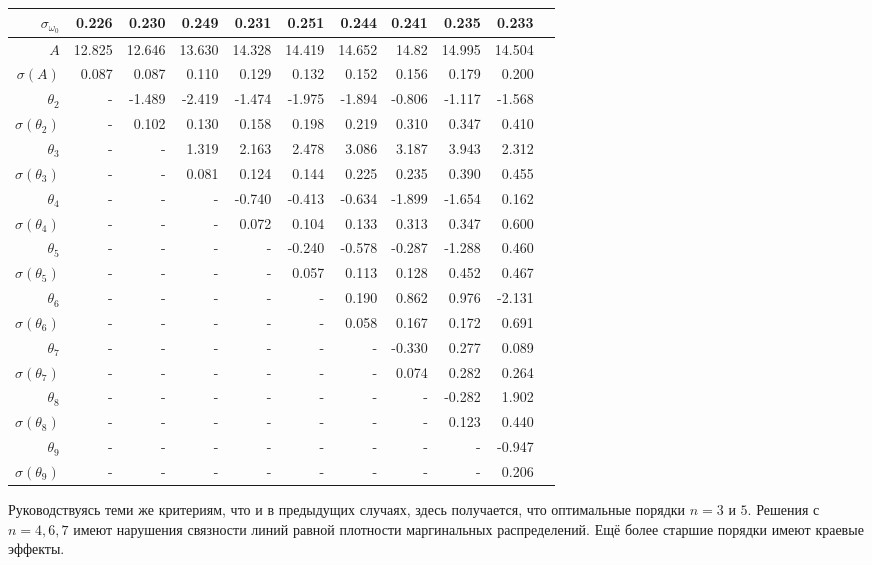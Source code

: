 \documentclass{matmex-diploma-custom}
\begin{document}
\begin{table}[h!!]
\begin{tabular}{r|rr|r|r|r|rrrrr}
 $\sigma_{\omega_0} $& 0.226       &     0.230 &   0.249 &   0.231 &   0.251 &   0.244 &    0.241 &   0.235 &   0.233 \\\hline
 $A $&12.825      &   12.646 &   13.630 &  14.328 &  14.419 &  14.652 &    14.82 &  14.995 &  14.504 \\
 $\sigma(A) $ & 0.087       &    0.087 &    0.110 &   0.129 &   0.132 &   0.152 &    0.156 &   0.179 &     0.200 \\
 $\theta_2$&-        &  -1.489 &  -2.419 &  -1.474 &  -1.975 &  -1.894 &   -0.806 &  -1.117 &  -1.568 \\
 $\sigma(\theta_2)$&-      &     0.102 &    0.130 &   0.158 &   0.198 &   0.219 &     0.310 &   0.347 &    0.410 \\
 $\theta_3$&-      &    - &   1.319 &   2.163 &   2.478 &   3.086 &    3.187 &   3.943 &   2.312 \\
 $\sigma(\theta_3)$&-      &    - &   0.081 &   0.124 &   0.144 &   0.225 &    0.235 &   0.390 &   0.455 \\
 $\theta_4$&-      &    - &    - &  -0.740 &  -0.413 &  -0.634 &   -1.899 &  -1.654 &   0.162 \\
 $\sigma(\theta_4)$&-      &    - &    - &     0.072 &   0.104 &   0.133 &    0.313 &   0.347 &   0.600 \\
 $\theta_5$&-      &    - &    - &    - &  -0.240 &  -0.578 &   -0.287 &  -1.288 &   0.460 \\
 $\sigma(\theta_5)$&-      &    - &    - &    - &     0.057 &   0.113 &    0.128 &   0.452 &   0.467 \\
 $\theta_6$&-      &    - &    - &    - &    - &   0.190 &    0.862 &   0.976 &  -2.131 \\
 $\sigma(\theta_6)$&-    &    - &    - &    - &    - &   0.058 &    0.167 &   0.172 &   0.691 \\
 $\theta_7$&-     &    - &    - &    - &    - &    - &  -0.330 &   0.277 &   0.089 \\
 $ \sigma(\theta_7)$&-     &    - &    - &    - &    - &    - &      0.074 &   0.282 &   0.264 \\
 $\theta_8$&-     &    - &    - &    - &    - &    - &    - &   -0.282 &   1.902 \\
 $ \sigma(\theta_8)$&-     &    - &    - &    - &    - &    - &    - &     0.123 &   0.440 \\
 $\theta_9$&-     &    - &    - &    - &    - &    - &    - &    - &  -0.947  \\
 $ \sigma(\theta_9)$&-     &    - &    - &    - &    - &    - &    - &    - &   0.206  \\
\end{tabular}
\end{table}
Руководствуясь теми же критериям, что и в предыдущих случаях, здесь получается, что оптимальные порядки $n=3$ и $5$. Решения с $n=4, 6, 7$ имеют нарушения связности линий равной плотности маргинальных распределений. Ещё более старшие порядки имеют краевые эффекты. 
\pagebreak
\end{document}
